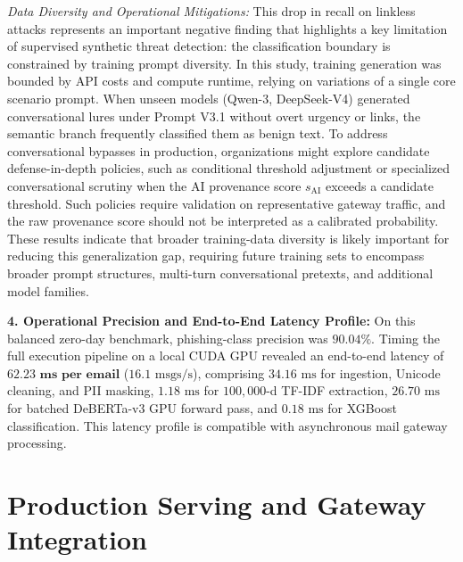 \documentclass[journal]{IEEEtran}
\begin{document}
\emph{Data Diversity and Operational Mitigations:} This drop in recall on linkless attacks represents an important negative finding that highlights a key limitation of supervised synthetic threat detection: the classification boundary is constrained by training prompt diversity. In this study, training generation was bounded by API costs and compute runtime, relying on variations of a single core scenario prompt. When unseen models (Qwen-3, DeepSeek-V4) generated conversational lures under Prompt V3.1 without overt urgency or links, the semantic branch frequently classified them as benign text. To address conversational bypasses in production, organizations might explore candidate defense-in-depth policies, such as conditional threshold adjustment or specialized conversational scrutiny when the AI provenance score $s_{\text{AI}}$ exceeds a candidate threshold. Such policies require validation on representative gateway traffic, and the raw provenance score should not be interpreted as a calibrated probability. These results indicate that broader training-data diversity is likely important for reducing this generalization gap, requiring future training sets to encompass broader prompt structures, multi-turn conversational pretexts, and additional model families.

\textbf{4. Operational Precision and End-to-End Latency Profile:} 
On this balanced zero-day benchmark, phishing-class precision was $\mathbf{90.04\%}$. Timing the full execution pipeline on a local CUDA GPU revealed an end-to-end latency of $\mathbf{62.23\text{ ms per email}}$ ($16.1\text{ msgs/s}$), comprising $34.16\text{ ms}$ for ingestion, Unicode cleaning, and PII masking, $1.18\text{ ms}$ for $100{,}000$-d TF-IDF extraction, $26.70\text{ ms}$ for batched DeBERTa-v3 GPU forward pass, and $0.18\text{ ms}$ for XGBoost classification. This latency profile is compatible with asynchronous mail gateway processing.

\section{Production Serving and Gateway Integration}
\label{sec:serving}
\end{document}
